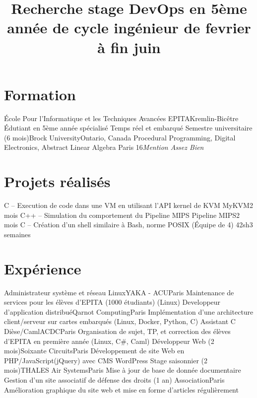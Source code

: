 \documentclass[10pt,a4paper,sans]{moderncv}
\title{Recherche stage DevOps\newline{}
 en 5ème année de cycle ingénieur\newline{}
 de fevrier à fin juin}
\begin{document}
\makecvtitle

\vspace{-1.5\baselineskip}

\section{Formation}
    {École Pour l'Informatique et les Techniques Avancées}
    {EPITA}{Kremlin-Bicêtre}{}
    {Édutiant en 5ème année spécialisé Temps réel et embarqué}
    {Semestre universitaire (6 mois)}{Brock University}{Ontario, Canada}{}
    {Procedural Programming, Digital Electronics, Abstract Linear Algebra}
    {Paris 16}{\textit{Mention Assez Bien}}{}

\section{Projets réalisés}
    {C -- Execution de code dans une VM en utilisant l'API kernel de KVM}
    {MyKVM}{2 mois}{}{}
    {C++ -- Simulation du comportement du Pipeline MIPS}
    {Pipeline MIPS}{2 mois}{}{}
    {C -- Création d'un shell similaire à Bash, norme POSIX (Équipe de 4)}
    {42sh}{3 semaines}{}{}

\section{Expérience}
    {Administrateur système et réseau Linux}{YAKA - ACU}{Paris}{}
    {Maintenance de services pour les élèves d'EPITA (1000 étudiants) (Linux)}
    {Developpeur d'application distribué}{Qarnot Computing}{Paris}{}
    {Implémentation d'une architecture client/serveur sur cartes embarqués (Linux, Docker, Python, C)}
    {Assistant C Dièse/Caml}{ACDC}{Paris}{}
    {Organisation de sujet, TP, et correction des élèves d'EPITA en première année (Linux, C\#, Caml)}
    {Développeur Web (2 mois)}{Soixante Circuits}{Paris}{}
    {Développement de site Web en PHP/JavaScript(jQuery) avec CMS WordPress}
    {Stage saisonnier (2 mois)}{THALES Air Systems}{Paris}{}
    {Mise à jour de base de donnée documentaire}
    {Gestion d'un site associatif de défense des droits (1 an)}
    {Association}{Paris}{}
    {Amélioration graphique du site web et mise en forme d'articles régulièrement}
\end{document}
